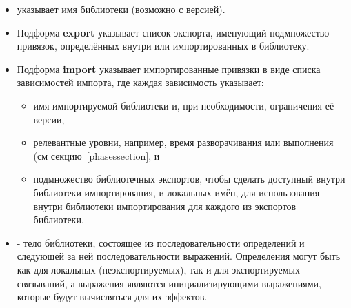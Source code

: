 \begin{itemize}
\item {} указывает имя библиотеки (возможно с версией).
\item Подформа {\cf\bfseries export} указывает список экспорта, именующий подмножество
  привязок, определённых внутри или импортированных в библиотеку.
\item Подформа {\cf\bfseries import} указывает импортированные привязки в виде списка
  зависимостей импорта, где каждая зависимость указывает:
\begin{itemize}
\item имя импортируемой библиотеки и, при необходимости, ограничения её версии,
\item релевантные уровни, например, время разворачивания или выполнения (см
  секцию~\ref{phasessection}, и
\item подмножество библиотечных экспортов, чтобы сделать доступный внутри библиотеки
  импортирования, и локальных имён, для использования внутри библиотеки
  импортирования для каждого из экспортов библиотеки.
\end{itemize}
\item {} - тело библиотеки, состоящее из последовательности определений
  и следующей за ней последовательности выражений. Определения могут быть как для локальных
  (неэкспортируемых), так и для экспортируемых связываний, а выражения являются
  инициализирующими выражениями, которые будут вычисляться для их эффектов.
\end{itemize}

